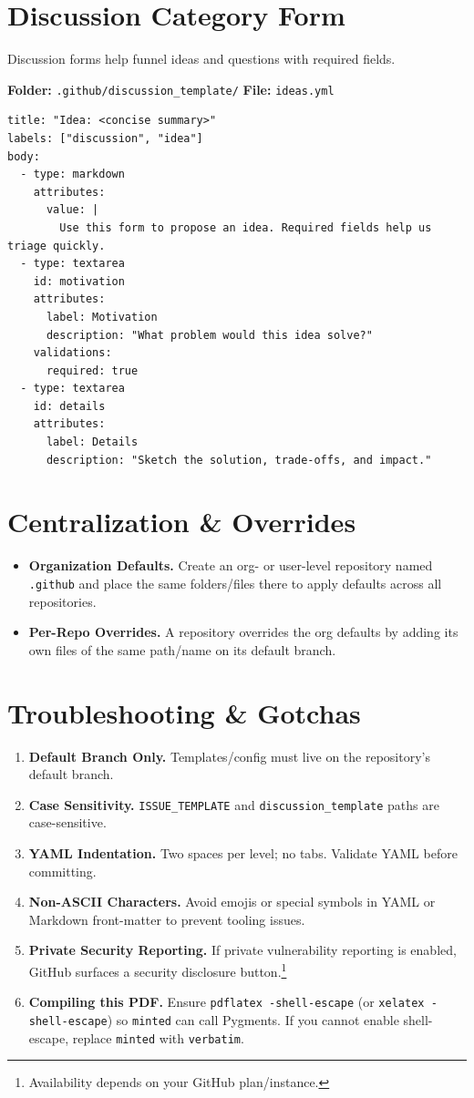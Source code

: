 \documentclass[11pt]{article}
\begin{document}
\section{Discussion Category Form}
Discussion forms help funnel ideas and questions with required fields.

\noindent\textbf{Folder:} \texttt{.github/discussion\_template/}\quad
\textbf{File:} \texttt{ideas.yml}
\begin{verbatim}
title: "Idea: <concise summary>"
labels: ["discussion", "idea"]
body:
  - type: markdown
    attributes:
      value: |
        Use this form to propose an idea. Required fields help us triage quickly.
  - type: textarea
    id: motivation
    attributes:
      label: Motivation
      description: "What problem would this idea solve?"
    validations:
      required: true
  - type: textarea
    id: details
    attributes:
      label: Details
      description: "Sketch the solution, trade-offs, and impact."
\end{verbatim}

\section{Centralization \& Overrides}
\begin{itemize}
  \item \textbf{Organization Defaults.} Create an org- or user-level repository named \texttt{.github} and place the same folders/files there to apply defaults across all repositories.
  \item \textbf{Per-Repo Overrides.} A repository overrides the org defaults by adding its own files of the same path/name on its default branch.
\end{itemize}

\section{Troubleshooting \& Gotchas}
\begin{enumerate}
  \item \textbf{Default Branch Only.} Templates/config must live on the repository's default branch.
  \item \textbf{Case Sensitivity.} \texttt{ISSUE\_TEMPLATE} and \texttt{discussion\_template} paths are case-sensitive.
  \item \textbf{YAML Indentation.} Two spaces per level; no tabs. Validate YAML before committing.
  \item \textbf{Non-ASCII Characters.} Avoid emojis or special symbols in YAML or Markdown front-matter to prevent tooling issues.
  \item \textbf{Private Security Reporting.} If private vulnerability reporting is enabled, GitHub surfaces a security disclosure button.\footnote{Availability depends on your GitHub plan/instance.}
  \item \textbf{Compiling this PDF.} Ensure \texttt{pdflatex -shell-escape} (or \texttt{xelatex -shell-escape}) so \texttt{minted} can call Pygments. If you cannot enable shell-escape, replace \texttt{minted} with \texttt{verbatim}.
\end{enumerate}
\end{document}
